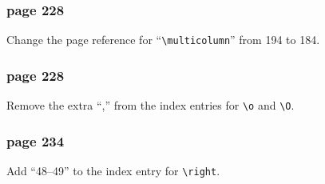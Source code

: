 \subsubsection*{page 228}
Change the page reference for ``\verb|\multicolumn|''
from 194  to 184.

\subsubsection*{page 228}
Remove the extra ``,'' from the index entries for \verb|\o|
and \verb|\O|.


\subsubsection*{page 234}
Add ``48--49'' to the index entry for \verb|\right|.
